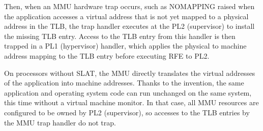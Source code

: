 Then, when an MMU hardware trap occurs, such as NOMAPPING raised when the application accesses a virtual address that is not yet mapped to a physical address in the TLB, the trap handler executes at the PL2 (supervisor) to install the missing TLB entry. Access to the TLB entry from this handler is then trapped in a PL1 (hypervisor) handler, which applies the physical to machine address mapping to the TLB entry before executing RFE to PL2.

On processors without SLAT, the MMU directly translates the virtual addresses of the application into machine addresses. Thanks to the invention, the same application and operating system code can run unchanged on the same system, this time without a virtual machine monitor. In that case, all MMU resources are configured to be owned by PL2 (supervisor), so accesses to the TLB entries by the MMU trap handler do not trap.
